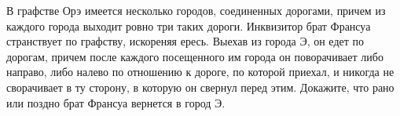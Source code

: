 \documentclass{article}
\begin{document}
В графстве Орэ имеется несколько городов, соединенных дорогами, причем из каждого города выходит ровно три таких дороги.
Инквизитор брат Франсуа странствует по графству, искореняя ересь. Выехав из города Э, он едет по дорогам, причем после каждого посещенного им города он поворачивает либо направо, либо налево по
отношению к дороге, по которой приехал, и никогда не сворачивает в ту сторону, в которую он свернул перед этим. Докажите, что рано или поздно брат Франсуа вернется в город Э.
\end{document}

